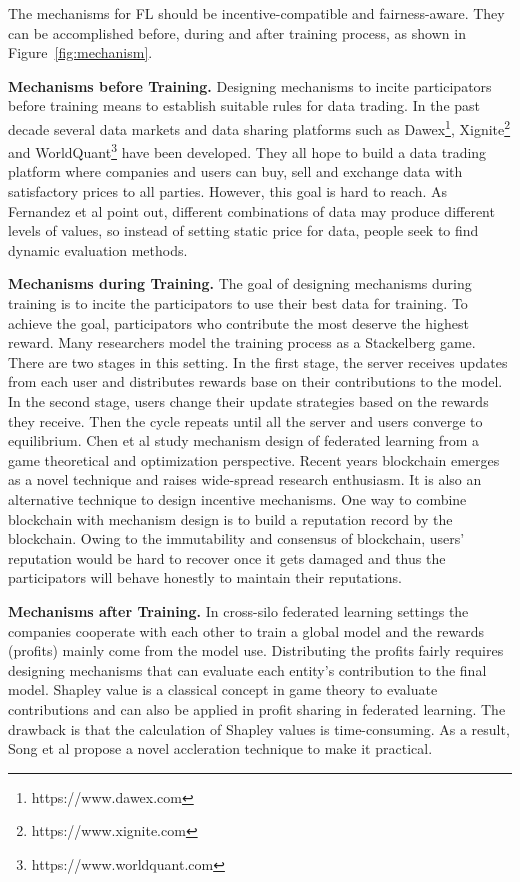 \documentclass[11pt]{article}
\newcommand\figref[1]{Figure~\ref{#1}}
\newcommand{\fakeparagraph}[1]{\vspace{1mm}\noindent\textbf{#1.}}
\begin{document}
The mechanisms for FL should be incentive-compatible and fairness-aware.
They can be accomplished before, during and after training process, as shown in \figref{fig:mechanism}.

\fakeparagraph{Mechanisms before Training}
Designing mechanisms to incite participators before training means to establish suitable rules for data trading.
In the past decade several data markets and data sharing platforms such as Dawex\footnote{https://www.dawex.com}, Xignite\footnote{https://www.xignite.com} and WorldQuant\footnote{https://www.worldquant.com} have been developed.
They all hope to build a data trading platform where companies and users can buy, sell and exchange data with satisfactory prices to all parties.
However, this goal is hard to reach. As Fernandez et al point out, different combinations of data may produce different levels of values\cite{DBLP:journals/pvldb/FernandezSF20}, 
so instead of setting static price for data, people seek to find dynamic evaluation methods.

\fakeparagraph{Mechanisms during Training}
The goal of designing mechanisms during training is to incite the participators to use their best data for training. 
To achieve the goal, participators who contribute the most deserve the highest reward. Many researchers model the training process as a Stackelberg game\cite{DBLP:journals/twc/PandeyTBTMH20}.
There are two stages in this setting. In the first stage, the server receives updates from each user and distributes rewards base on their contributions to the model. In the second stage, users change their update strategies based on the rewards they receive.
Then the cycle repeats until all the server and users converge to equilibrium. 
Chen et al study mechanism design of federated learning from a game theoretical and optimization perspective.
Recent years blockchain emerges as a novel technique and raises wide-spread research enthusiasm. It is also an alternative technique to design incentive mechanisms.
One way to combine blockchain with mechanism design is to build a reputation record by the blockchain\cite{DBLP:journals/iotj/KangXNXZ19}. 
Owing to the immutability and consensus of blockchain, users' reputation would be hard to recover once it gets damaged and thus the participators will behave honestly to maintain their reputations.

\fakeparagraph{Mechanisms after Training}
In cross-silo federated learning settings the companies cooperate with each other to train a global model and the rewards (profits) mainly come from the model use.
Distributing the profits fairly requires designing mechanisms that can evaluate each entity's contribution to the final model. 
Shapley value is a classical concept in game theory to evaluate contributions and can also be applied in profit sharing in federated learning.
The drawback is that the calculation of Shapley values is time-consuming. As a result, Song et al propose a novel accleration technique to make it practical\cite{DBLP:conf/bigdataconf/SongTW19}.
\end{document}
